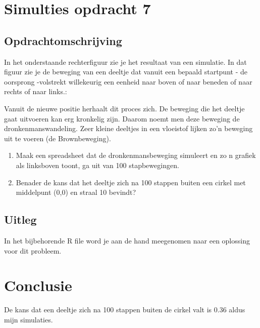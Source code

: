 \documentclass{article}
\begin{document}



\section{Simulties opdracht 7}
\label{sec:sample_main}

\subsection{Opdrachtomschrijving}
\label{subsec:sample_opdrom}

In het onderstaande rechterfiguur zie je het resultaat van een simulatie. In dat figuur zie je de beweging van een deeltje dat vanuit een bepaald startpunt - de oorsprong -volstrekt willekeurig een eenheid naar boven of naar beneden of naar rechts of naar links.:

Vanuit de nieuwe positie herhaalt dit proces zich. De beweging die het deeltje gaat uitvoeren kan erg kronkelig zijn. Daarom noemt men deze beweging de dronkenmanswandeling. Zeer kleine deeltjes in een vloeistof lijken zo'n beweging uit te voeren (de Brownbeweging).

\begin{enumerate}[label=(\Alph*)]

\item Maak een spreadsheet dat de dronkenmansbeweging simuleert en zo n grafiek als linksboven toont, ga uit van 100 stapbewegingen.

\item Benader de kans dat het deeltje zich na 100 stappen buiten een cirkel met middelpunt (0,0) en straal 10 bevindt?

\end{enumerate}

\newpage
\subsection{Uitleg}
\label{subsec:sample_uitv}

In het bijbehorende R file word je aan de hand meegenomen naar een oplossing voor dit probleem.


\section{Conclusie}
\label{subsec:sample_con}
De kans dat een deeltje zich na 100 stappen buiten de cirkel valt is 0.36 aldus mijn simulaties.
\end{document}
